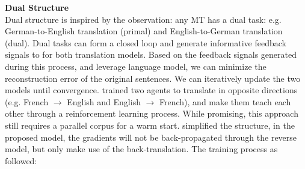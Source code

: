 







\textbf{Dual Structure}\\
Dual structure is inspired by the observation: any MT has a dual task: e.g. German-to-English translation (primal) and English-to-German translation (dual). Dual tasks can form a closed loop and generate informative  feedback signals to for both translation models. Based on the feedback signals generated during this process, and leverage language model, we can minimize the reconstruction error of the original sentences. We can iteratively update the two models until convergence.   \cite{he2016dual} trained two agents to translate in opposite directions (e.g. French $\rightarrow$ English and English $\rightarrow$ French), and make them teach each other through a reinforcement learning process. While promising, this approach still requires a parallel corpus for a warm start. \cite{lample2018phrase} simplified the structure, in the proposed model, the gradients will not be back-propagated through the reverse model, but only make use of the back-translation. The training process as followed:\\

